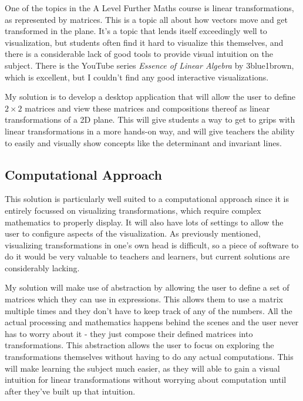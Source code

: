 \documentclass[../main.tex]{subfiles}
\begin{document}
One of the topics in the A Level Further Maths course is linear transformations, as represented by matrices. This is a topic all about how vectors move and get transformed in the plane. It's a topic that lends itself exceedingly well to visualization, but students often find it hard to visualize this themselves, and there is a considerable lack of good tools to provide visual intuition on the subject. There is the YouTube series \textit{Essence of Linear Algebra} by 3blue1brown\cite{essence-of-linear-algebra}, which is excellent, but I couldn't find any good interactive visualizations.

My solution is to develop a desktop application that will allow the user to define $2 \times 2$ matrices and view these matrices and compositions thereof as linear transformations of a 2D plane. This will give students a way to get to grips with linear transformations in a more hands-on way, and will give teachers the ability to easily and visually show concepts like the determinant and invariant lines.

\subsection{Computational Approach\label{subsection:computational-approach}}

This solution is particularly well suited to a computational approach since it is entirely focussed on visualizing transformations, which require complex mathematics to properly display. It will also have lots of settings to allow the user to configure aspects of the visualization. As previously mentioned, visualizing transformations in one's own head is difficult, so a piece of software to do it would be very valuable to teachers and learners, but current solutions are considerably lacking.

My solution will make use of abstraction by allowing the user to define a set of matrices which they can use in expressions. This allows them to use a matrix multiple times and they don't have to keep track of any of the numbers. All the actual processing and mathematics happens behind the scenes and the user never has to worry about it - they just compose their defined matrices into transformations. This abstraction allows the user to focus on exploring the transformations themselves without having to do any actual computations. This will make learning the subject much easier, as they will able to gain a visual intuition for linear transformations without worrying about computation until after they've built up that intuition.
\end{document}
